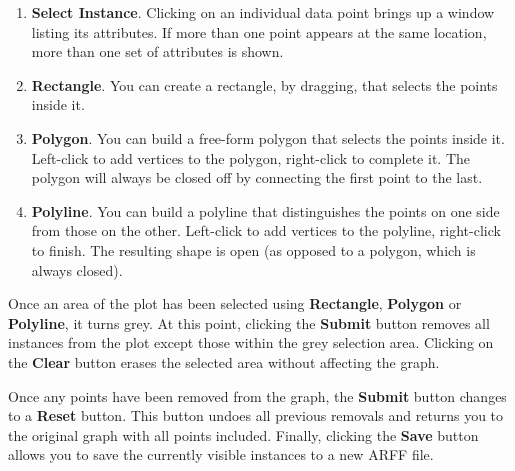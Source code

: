 \documentclass[a4paper]{article}
\begin{document}
\begin{enumerate}
\item \textbf{Select Instance}.
Clicking on an individual data point brings up a window listing its attributes.
If more than one point appears at the same location, more than one set of
attributes is shown.
\item \textbf{Rectangle}.
You can create a rectangle, by dragging, that selects the points inside it.
\item \textbf{Polygon}.
You can build a free-form polygon that selects the points inside it. Left-click
to add vertices to the polygon, right-click to complete it. The polygon will
always be closed off by connecting the first point to the last.
\item \textbf{Polyline}.
You can build a polyline that distinguishes the points on one side from those
on the other. Left-click to add vertices to the polyline, right-click to
finish. The resulting shape is open (as opposed to a polygon, which is
always closed).
\end{enumerate}

Once an area of the plot has been selected using \textbf{Rectangle},
\textbf{Polygon} or \textbf{Polyline}, it turns grey.  At this point, clicking
the \textbf{Submit} button removes all instances from the plot except those
within the grey selection area.  Clicking on the \textbf{Clear} button erases
the selected area without affecting the graph.

Once any points have been removed from the graph, the \textbf{Submit} button
changes to a \textbf{Reset} button.  This button undoes all previous removals
and returns you to the original graph with all points included.  Finally,
clicking the \textbf{Save} button allows you to save the currently visible
instances to a new ARFF file.

\newpage
\end{document}
